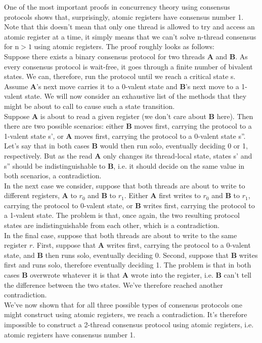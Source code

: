 \documentclass[main]{subfiles}
\begin{document}
\begin{example}
    One of the most important proofs in concurrency theory using consensus protocols shows that, surprisingly, atomic registers have consensus number 1. Note that this doesn't mean that only one thread is allowed to try and access an atomic register at a time, it simply means that we can't solve n-thread consensus for n$>1$ using atomic registers. The proof roughly looks as follows:\\[3mm]
    Suppose there exists a binary consensus protocol for two threads \textbf{A} and \textbf{B}. As every consensus protocol is wait-free, it goes through a finite number of bivalent states. We can, therefore, run the protocol until we reach a critical state s. Assume \textbf{A}'s next move carries it to a 0-valent state and \textbf{B}'s next move to a 1-valent state. We will now consider an exhaustive list of the methods that they might be about to call to cause such a state transition.\\[3mm]
    \indent Suppose \textbf{A} is about to read a given register (we don't care about \textbf{B} here). Then there are two possible scenarios: either \textbf{B} moves first, carrying the protocol to a 1-valent state s', or \textbf{A} moves first, carrying the protocol to a 0-valent state s''. Let's say that in both cases \textbf{B} would then run solo, eventually deciding 0 or 1, respectively. But as the read \textbf{A} only changes its thread-local state, states s' and s'' should be indistinguishable to \textbf{B}, i.e. it should decide on the same value in both scenarios, a contradiction.\\
    \indent In the next case we consider, suppose that both threads are about to write to different registers, \textbf{A} to $r_0$ and \textbf{B} to $r_1$. Either \textbf{A} first writes to $r_0$ and \textbf{B} to $r_1$, carrying the protocol to 0-valent state, or \textbf{B} writes first, carrying the protocol to a 1-valent state. The problem is that, once again, the two resulting protocol states are indistinguishable from each other, which is a contradiction.\\
    \indent In the final case, suppose that both threads are about to write to the same register $r$. First, suppose that \textbf{A} writes first, carrying the protocol to a 0-valent state, and \textbf{B} then runs solo, eventually deciding 0. Second, suppose that \textbf{B} writes first and runs solo, therefore eventually deciding 1. The problem is that in both cases \textbf{B} overwrote whatever it is that \textbf{A} wrote into the register, i.e. \textbf{B} can't tell the difference between the two states. We've therefore reached another contradiction.\\[3mm]
    We've now shown that for all three possible types of consensus protocols one might construct using atomic registers, we reach a contradiction. It's therefore impossible to construct a 2-thread consensus protocol using atomic registers, i.e. atomic registers have consensus number 1.
\end{example}
\end{document}
